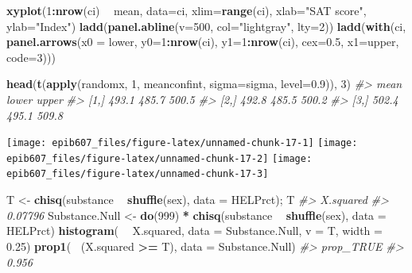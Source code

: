 \documentclass[]{book}
\makeatletter
\newenvironment{Shaded}{\begin{snugshade}}{\end{snugshade}}
\newcommand{\KeywordTok}[1]{\textcolor[rgb]{0.13,0.29,0.53}{\textbf{#1}}}
\newcommand{\DataTypeTok}[1]{\textcolor[rgb]{0.13,0.29,0.53}{#1}}
\newcommand{\DecValTok}[1]{\textcolor[rgb]{0.00,0.00,0.81}{#1}}
\newcommand{\FloatTok}[1]{\textcolor[rgb]{0.00,0.00,0.81}{#1}}
\newcommand{\StringTok}[1]{\textcolor[rgb]{0.31,0.60,0.02}{#1}}
\newcommand{\CommentTok}[1]{\textcolor[rgb]{0.56,0.35,0.01}{\textit{#1}}}
\newcommand{\OperatorTok}[1]{\textcolor[rgb]{0.81,0.36,0.00}{\textbf{#1}}}
\newcommand{\NormalTok}[1]{#1}
\newenvironment{kframe}{%
\medskip{}
\setlength{\fboxsep}{.8em}
 \def\at@end@of@kframe{}%
 \ifinner\ifhmode%
  \def\at@end@of@kframe{\end{minipage}}%
  \begin{minipage}{\columnwidth}%
 \fi\fi%
 \def\FrameCommand##1{\hskip\@totalleftmargin \hskip-\fboxsep
 \colorbox{shadecolor}{##1}\hskip-\fboxsep
     \hskip-\linewidth \hskip-\@totalleftmargin \hskip\columnwidth}%
 \MakeFramed {\advance\hsize-\width
   \@totalleftmargin\z@ \linewidth\hsize
   \@setminipage}}%
 {\par\unskip\endMakeFramed%
 \at@end@of@kframe}
\renewenvironment{Shaded}{\begin{kframe}}{\end{kframe}}
\makeatother
\begin{document}
\begin{Shaded}
\begin{Highlighting}[]
\KeywordTok{xyplot}\NormalTok{(}\DecValTok{1}\OperatorTok{:}\KeywordTok{nrow}\NormalTok{(ci) }\OperatorTok{~}\StringTok{ }\NormalTok{mean, }\DataTypeTok{data=}\NormalTok{ci, }\DataTypeTok{xlim=}\KeywordTok{range}\NormalTok{(ci), }\DataTypeTok{xlab=}\StringTok{"SAT score"}\NormalTok{, }\DataTypeTok{ylab=}\StringTok{"Index"}\NormalTok{)}
\KeywordTok{ladd}\NormalTok{(}\KeywordTok{panel.abline}\NormalTok{(}\DataTypeTok{v=}\DecValTok{500}\NormalTok{, }\DataTypeTok{col=}\StringTok{"lightgray"}\NormalTok{, }\DataTypeTok{lty=}\DecValTok{2}\NormalTok{))}
\KeywordTok{ladd}\NormalTok{(}\KeywordTok{with}\NormalTok{(ci, }\KeywordTok{panel.arrows}\NormalTok{(}\DataTypeTok{x0 =}\NormalTok{ lower, }\DataTypeTok{y0=}\DecValTok{1}\OperatorTok{:}\KeywordTok{nrow}\NormalTok{(ci), }\DataTypeTok{y1=}\DecValTok{1}\OperatorTok{:}\KeywordTok{nrow}\NormalTok{(ci), }\DataTypeTok{cex=}\FloatTok{0.5}\NormalTok{,}
                           \DataTypeTok{x1=}\NormalTok{upper, }\DataTypeTok{code=}\DecValTok{3}\NormalTok{)))}

\KeywordTok{head}\NormalTok{(}\KeywordTok{t}\NormalTok{(}\KeywordTok{apply}\NormalTok{(randomx, }\DecValTok{1}\NormalTok{, meanconfint, }\DataTypeTok{sigma=}\NormalTok{sigma, }\DataTypeTok{level=}\FloatTok{0.9}\NormalTok{)), }\DecValTok{3}\NormalTok{)}
\CommentTok{#>       mean lower upper}
\CommentTok{#> [1,] 493.1 485.7 500.5}
\CommentTok{#> [2,] 492.8 485.5 500.2}
\CommentTok{#> [3,] 502.4 495.1 509.8}
\end{Highlighting}
\end{Shaded}

\begin{center}\texttt{[image: epib607\_files/figure-latex/unnamed-chunk-17-1]} \texttt{[image: epib607\_files/figure-latex/unnamed-chunk-17-2]} \texttt{[image: epib607\_files/figure-latex/unnamed-chunk-17-3]} \end{center}

\begin{Shaded}
\begin{Highlighting}[]
\NormalTok{T <-}\StringTok{ }\KeywordTok{chisq}\NormalTok{(substance }\OperatorTok{~}\StringTok{ }\KeywordTok{shuffle}\NormalTok{(sex), }\DataTypeTok{data =}\NormalTok{ HELPrct); T}
\CommentTok{#> X.squared }
\CommentTok{#>   0.07796}
\NormalTok{Substance.Null <-}\StringTok{ }\KeywordTok{do}\NormalTok{(}\DecValTok{999}\NormalTok{) }\OperatorTok{*}\StringTok{ }\KeywordTok{chisq}\NormalTok{(substance }\OperatorTok{~}\StringTok{ }\KeywordTok{shuffle}\NormalTok{(sex), }\DataTypeTok{data =}\NormalTok{ HELPrct)}
\KeywordTok{histogram}\NormalTok{( }\OperatorTok{~}\StringTok{ }\NormalTok{X.squared, }\DataTypeTok{data =}\NormalTok{ Substance.Null, }\DataTypeTok{v =}\NormalTok{ T, }\DataTypeTok{width =} \FloatTok{0.25}\NormalTok{)}
\KeywordTok{prop1}\NormalTok{( }\OperatorTok{~}\NormalTok{(X.squared }\OperatorTok{>=}\StringTok{ }\NormalTok{T), }\DataTypeTok{data =}\NormalTok{ Substance.Null)}
\CommentTok{#> prop_TRUE }
\CommentTok{#>     0.956}
\end{Highlighting}
\end{Shaded}
\end{document}
